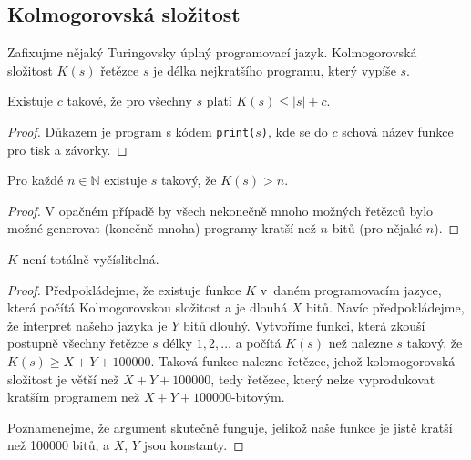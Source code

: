 \subsection{Kolmogorovská složitost}

Zafixujme nějaký Turingovsky úplný programovací jazyk.  Kolmogorovská
složitost $K(s)$ řetězce $s$ je délka nejkratšího programu, který vypíše
$s$.

\begin{theorem}
    Existuje $c$ takové, že pro všechny $s$ platí
    $K(s) \leq |s| + c$.
\end{theorem}

\begin{proof}
Důkazem je program s kódem \verb|print(|$s$\verb|)|, kde se do $c$
schová název funkce pro tisk a závorky.
\end{proof}

\begin{theorem}
    Pro každé $n \in \mathbb{N}$ existuje $s$ takový, že $K(s) > n$.
\end{theorem}

\begin{proof}
V opačném případě by všech nekonečně mnoho možných řetězců bylo možné
generovat (konečně mnoha) programy kratší než $n$ bitů (pro nějaké $n$).
\end{proof}

\pagebreak

\begin{theorem}
    $K$ není totálně vyčíslitelná.
\end{theorem}

\begin{proof}
Předpokládejme, že existuje funkce $K$ v~daném programovacím jazyce,
která počítá Kolmogorovskou složitost
a je dlouhá $X$ bitů. Navíc předpokládejme, že interpret našeho jazyka
je $Y$ bitů dlouhý. Vytvoříme funkci, která zkouší postupně všechny řetězce $s$ délky
$1,2,\ldots$ a počítá $K(s)$ než nalezne $s$ takový, že $K(s) \geq
X+Y+100000$. Taková funkce nalezne řetězec, jehož kolomogorovská
složitost je větší než $X+Y+100000$, tedy řetězec, který nelze
vyprodukovat kratším programem než $X+Y+100000$-bitovým.

Poznamenejme, že argument skutečně funguje, jelikož naše funkce je jistě
kratší než 100000 bitů, a $X$, $Y$ jsou konstanty.
\end{proof}

